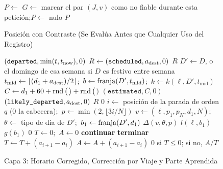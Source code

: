 \begin{figure}[ht]
\caption{Posición con Contraste (Se Evalúa Antes que Cualquier Uso del Registro)}\label{alg:contraste}
\begin{algorithmic}[1]
  \State $P\gets$
    \State $G\gets$
      \State marcar el par $(J,v)$ como no fiable durante esta petición;\quad $P\gets$ nulo
    \EndIf
  \EndIf
  \State \Return $P$
\EndFunction
\end{algorithmic}
\end{figure}

\begin{figure}[ht]
\caption{Capa 3: Horario Corregido, Corrección por Viaje y Parte Aprendida}\label{alg:capa3}
\begin{algorithmic}[1]
   \Return $(\texttt{departed},\min(t,t_{\mathrm{now}}),0)$ \EndIf
  \State $R\gets(\texttt{scheduled},a_{\mathrm{dest}},0)$
   \Return $R$ \EndIf
  \State $D'\gets D$, o el domingo de esa semana si $D$ es festivo entre semana
  \State $t_{\mathrm{mid}}\gets\lfloor(d_1+a_{\mathrm{dest}})/2\rfloor$;\ $b\gets\operatorname{franja}(D',t_{\mathrm{mid}})$;\ $k\gets k(\ell,D',t_{\mathrm{mid}})$
  \State $C\gets d_1+60+\operatorname{rnd}\big($$\big)+\operatorname{rnd}\big($$\big)$
   \Return $(\texttt{estimated},C,0)$ \EndIf
    \State \Return $(\texttt{likely\_departed},a_{\mathrm{dest}},0)$
  \EndIf
  \State \Return $R$
\EndFunction
\Statex
{}
   \Return $0$ \EndIf
  \State $i\gets$ posición de la parada de orden $q$ (0 la cabecera);\ $p\gets\min(2,\lfloor3i/N\rfloor)$
  \State $v\gets(\ell,p_1,p_N,d_1,N)$;\ $\theta\gets$ tipo de día de $D'$;\ $b_1\gets\operatorname{franja}(D',d_1)$
   \Return $\Delta(v,\theta,p)$ \EndIf
   \Return $l(\ell,b_1)$ \EndIf
   \Return $g(b_1)$ \EndIf
  \State \Return $0$
\EndFunction
\Statex
{}
  \State $T\gets0$;\ $A\gets0$
     \textbf{continuar} \EndIf
     \textbf{terminar} \EndIf
    \State $T\gets T+(a_{i+1}-a_i)$
     $A\gets A+(a_{i+1}-a_i)$ \EndIf
  \EndFor
  \State \Return $0$ si $T\le0$; si no, $A/T$
\EndFunction
\end{algorithmic}
\end{figure}

